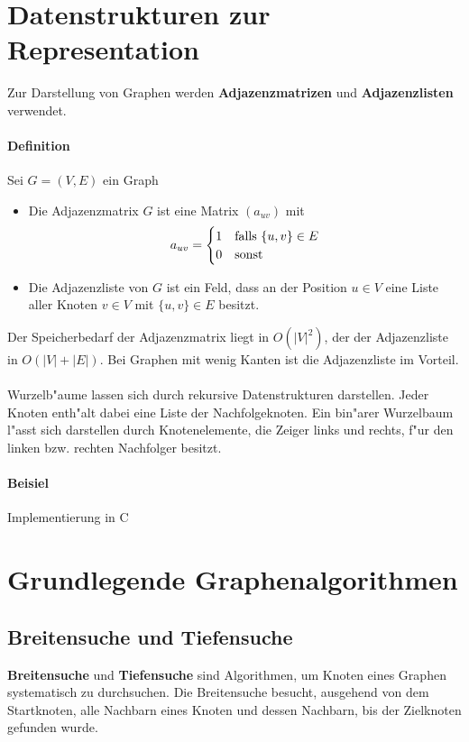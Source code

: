 \section{Datenstrukturen zur Representation}

Zur Darstellung von Graphen werden \textbf{Adjazenzmatrizen} und \textbf{Adjazenzlisten} verwendet.

\paragraph{Definition} Sei $G=(V,E)$ ein Graph
\begin{itemize}
    \item Die Adjazenzmatrix $G$ ist eine Matrix $(a_{uv})$ mit
          \[
            a_{uv}=\begin{cases}
                1 & \text{falls } \{u,v\}\in E\\
                0 & \text{sonst}
            \end{cases}
          \]
    \item Die Adjazenzliste von $G$ ist ein Feld, dass an der Position $u\in V$ eine Liste aller Knoten
          $v\in V$ mit $\{u,v\}\in E$ besitzt.
\end{itemize}
Der Speicherbedarf der Adjazenzmatrix liegt in $O(|V|^2)$, der der Adjazenzliste in $O(|V|+|E|)$. Bei
Graphen mit wenig Kanten ist die Adjazenzliste im Vorteil.\\
\\ %
Wurzelb"aume lassen sich durch rekursive Datenstrukturen darstellen. Jeder Knoten enth"alt dabei eine Liste
der Nachfolgeknoten. Ein bin"arer Wurzelbaum l"asst sich darstellen durch Knotenelemente, die Zeiger links
und rechts, f"ur den linken bzw. rechten Nachfolger besitzt.

\paragraph{Beisiel} Implementierung in C

\section{Grundlegende Graphenalgorithmen}
\subsection{Breitensuche und Tiefensuche}

\textbf{Breitensuche} und \textbf{Tiefensuche} sind Algorithmen, um Knoten eines Graphen systematisch zu
durchsuchen. Die Breitensuche besucht, ausgehend von dem Startknoten, alle Nachbarn eines Knoten und dessen
Nachbarn, bis der Zielknoten gefunden wurde.

